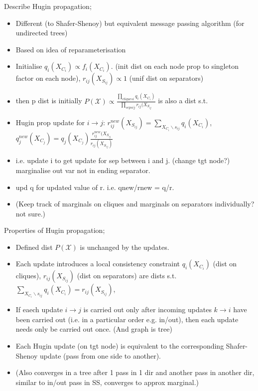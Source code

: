 \documentclass{article}
\begin{document}
Describe Hugin propagation; \begin{itemize}
    \item Different (to Shafer-Shenoy) but equivalent message passing algorithm (for undirected trees)
    \item Based on idea of reparameterisation
    \item Initialise $q_i(X_{C_i})\propto f_i(X_{C_i})$. (init dist on each node prop to singleton factor on each node), $r_{ij}(X_{S_{ij}})\propto 1$ (unif dist on separators)
    \item then p dist is initially $P(\mathcal{X})\propto\frac{\prod_{cliques i}q_i(X_{C_i})}{\prod_{seps ij}r_{ij}(X_{S_{ij}}}$ is also a dist s.t.
    \item Hugin prop update for $i\rightarrow j$: $r_{ij}^{new}(X_{S_{ij}})=\sum_{X_{C_i}\backslash s_{ij}}q_i(X_{C_i})$, $q_j^{new}(X_{C_j})=q_j(X_{C_j})\frac{r_{ij}^{new}(X_{S_{ij}}}{r_{ij}(X_{S_{ij}})}$
    \item i.e. update i to get update for sep between i and j. (change tgt node?) marginalise out var not in ending separator.
    \item upd q for updated value of r. i.e. qnew/rnew = q/r.
    \item (Keep track of marginals on cliques and marginals on separators individually? not sure.)
\end{itemize}

Properties of Hugin propagation; \begin{itemize}
    \item Defined dist $P(\mathcal{X})$ is unchanged by the updates.
    \item Each update introduces a local consistency constraint
    $q_i(X_{C_i})$ (dist on cliques), $r_{ij}(X_{S_{ij}})$ (dist on separators) are dists s.t. $\sum_{X_{C_i}\backslash s_{ij}}q_i(X_{C_i})=r_{ij}(X_{S_{ij}})$,
    \item If eaech update $i\rightarrow j$ is carried out only after incoming updates $k\rightarrow i$ have been carried out (i.e. in a particular order e.g. in/out), then each update needs only be carried out once. (And graph is tree)
    \item Each Hugin update (on tgt node) is equivalent to the corresponding Shafer-Shenoy update (pass from one side to another).
    \item (Also converges in a tree after 1 pass in 1 dir and another pass in another dir, similar to in/out pass in SS, converges to approx marginal.)
\end{itemize}
\end{document}
